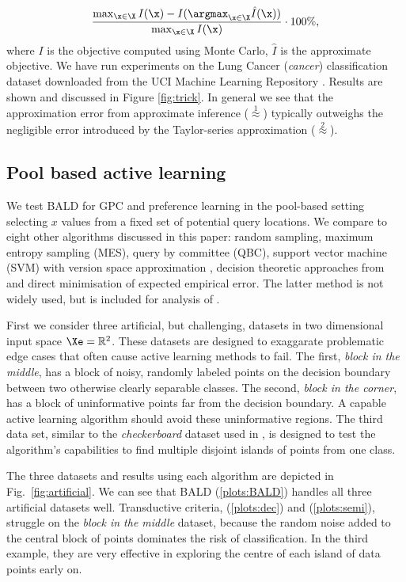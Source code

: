 \begin{align}
	\frac{ \max_{\x\in\X} I(\x) - I(\argmax_{\x\in\X}\hat{I}(\x)) }{{\max_{\x\in\X}I(\x) }}\cdot 100\%,
\end{align}
where $I$ is the objective computed using Monte Carlo, $\hat{I}$ is the approximate objective. We have run experiments on the Lung Cancer (\emph{cancer}) classification dataset \citep{Hong1991} downloaded from the UCI Machine Learning Repository \citep{UCIRepository}. Results are shown and discussed in Figure \ref{fig:trick}. In general we see that the approximation error from approximate inference ({\scriptsize $\stackrel{1}{\approx}$}) typically outweighs the negligible error introduced by the Taylor-series approximation ({\scriptsize $\stackrel{2}{\approx}$}).

\subsection{Pool based active learning}

We test BALD for GPC and preference learning in the pool-based setting \ie selecting $x$ values from a fixed set of potential query locations. We compare to eight other algorithms discussed in this paper: random sampling, maximum entropy sampling (MES), query by committee (QBC), support vector machine (SVM) with version space approximation \cite{Tong2002}, decision theoretic approaches from \citep{Kapoor2007, Zhu2003} and direct minimisation of expected empirical error. The latter method is not widely used, but is included for analysis of \cite{Kapoor2007}.

First we consider three artificial, but challenging, datasets in two dimensional input space $\Xe = \mathbb{R}^2$. These datasets are designed to exaggarate problematic edge cases that often cause active learning methods to fail. The first, \emph{block in the middle}, has a block of noisy, randomly labeled points on the decision boundary between two otherwise clearly separable classes. The second, \emph{block in the corner}, has a block of uninformative points far from the decision boundary. A capable active learning algorithm should avoid these uninformative regions. The third data set, similar to the \emph{checkerboard} dataset used in \cite{Zhu2003}, is designed to test the algorithm's capabilities to find multiple disjoint islands of points from one class. 

The three datasets and results using each algorithm are depicted in Fig.\ \ref{fig:artificial}. We can see that BALD (\ref{plots:BALD}) handles all three artificial datasets well. Transductive criteria, \citet{Kapoor2007} (\ref{plots:dec}) and \citet{Zhu2003} (\ref{plots:semi}), struggle on the \emph{block in the middle} dataset, because the random noise added to the central block of points dominates the risk of classification. In the third example, they are very effective in exploring the centre of each island of data points early on.

